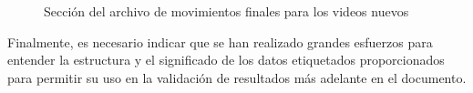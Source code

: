 \begin{figure}[H]
    \centering
    \caption{Sección del archivo de movimientos finales para los videos nuevos}
    \label{fig:Excel2}
\end{figure}

Finalmente, es necesario indicar que se han realizado grandes esfuerzos para entender la estructura y el significado de los datos etiquetados proporcionados para permitir su uso en la validación 
de resultados más adelante en el documento.